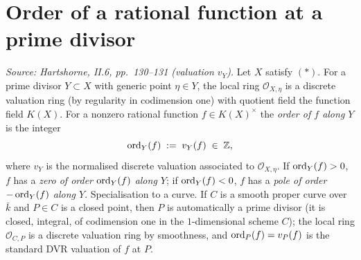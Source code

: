\section{Order of a rational function at a prime divisor}
\begin{definition}
  \label{def:order_at_point}

  \textit{Source: Hartshorne, II.6, pp.~130--131 (valuation \(v_Y\)).}
  Let \(X\) satisfy \((*)\). For a prime divisor \(Y \subset X\) with generic
  point \(\eta \in Y\), the local ring \(\mathcal O_{X, \eta}\) is a discrete
  valuation ring (by regularity in codimension one) with quotient field the
  function field \(K(X)\). For a nonzero rational function \(f \in K(X)^{\times}\)
  the \emph{order of \(f\) along \(Y\)} is the integer
  \[
    \operatorname{ord}_Y(f) \;:=\; v_Y(f) \;\in\; \mathbb Z,
  \]
  where \(v_Y\) is the normalised discrete valuation associated to
  \(\mathcal O_{X, \eta}\). If \(\operatorname{ord}_Y(f) > 0\), \(f\) has a \emph{zero of
  order \(\operatorname{ord}_Y(f)\) along \(Y\)}; if \(\operatorname{ord}_Y(f) < 0\), \(f\) has a \emph{pole
  of order \(-\operatorname{ord}_Y(f)\) along \(Y\)}.
  Specialisation to a curve. If \(C\) is a smooth proper curve over \(\bar k\)
  and \(P \in C\) is a closed point, then \(P\) is automatically a prime
  divisor (it is closed, integral, of codimension one in the \(1\)-dimensional
  scheme \(C\)); the local ring \(\mathcal O_{C, P}\) is a discrete valuation
  ring by smoothness, and \(\operatorname{ord}_P(f) = v_P(f)\) is the standard DVR
  valuation of \(f\) at \(P\).

\end{definition}
